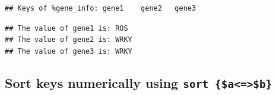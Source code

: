 \documentclass[]{book}
\makeatletter
\newenvironment{Shaded}{\begin{snugshade}}{\end{snugshade}}
\newcommand{\CharTok}[1]{\textcolor[rgb]{0.31,0.60,0.02}{#1}}
\newcommand{\DataTypeTok}[1]{\textcolor[rgb]{0.13,0.29,0.53}{#1}}
\newcommand{\FunctionTok}[1]{\textcolor[rgb]{0.00,0.00,0.00}{#1}}
\newcommand{\KeywordTok}[1]{\textcolor[rgb]{0.13,0.29,0.53}{\textbf{#1}}}
\newcommand{\NormalTok}[1]{#1}
\newcommand{\StringTok}[1]{\textcolor[rgb]{0.31,0.60,0.02}{#1}}
\newenvironment{kframe}{%
\medskip{}
\setlength{\fboxsep}{.8em}
 \def\at@end@of@kframe{}%
 \ifinner\ifhmode%
  \def\at@end@of@kframe{\end{minipage}}%
  \begin{minipage}{\columnwidth}%
 \fi\fi%
 \def\FrameCommand##1{\hskip\@totalleftmargin \hskip-\fboxsep
 \colorbox{shadecolor}{##1}\hskip-\fboxsep
     \hskip-\linewidth \hskip-\@totalleftmargin \hskip\columnwidth}%
 \MakeFramed {\advance\hsize-\width
   \@totalleftmargin\z@ \linewidth\hsize
   \@setminipage}}%
 {\par\unskip\endMakeFramed%
 \at@end@of@kframe}
\renewenvironment{Shaded}{\begin{kframe}}{\end{kframe}}
\makeatother
\begin{document}
\begin{verbatim}
## Keys of %gene_info: gene1    gene2   gene3
\end{verbatim}

\begin{Shaded}
\end{Shaded}

\begin{verbatim}
## The value of gene1 is: ROS
## The value of gene2 is: WRKY
## The value of gene3 is: WRKY
\end{verbatim}

\hypertarget{sort-keys-numerically-using-sort-ab}{%
\subsection{\texorpdfstring{Sort keys numerically using \texttt{sort\ \{\$a\textless{}=\textgreater{}\$b\}}}{Sort keys numerically using sort \{\$a\textless{}=\textgreater{}\$b\}}}\label{sort-keys-numerically-using-sort-ab}}
\end{document}

